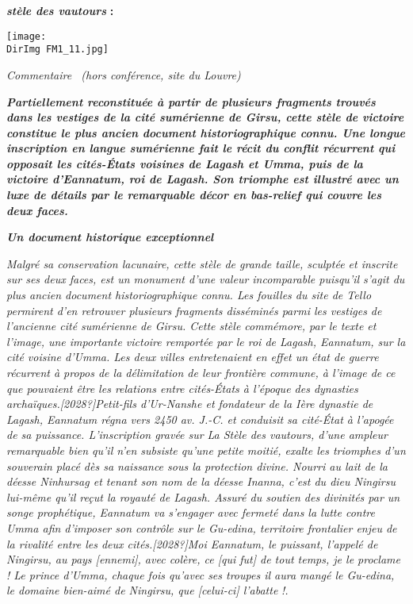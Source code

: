 \documentclass[a4paper]{article}
\newcommand{\DirImg}{../img/FaivreMartin/}
\begin{document}
\textbf{\textit{stèle des vautours}}\textbf{ : }


 \texttt{[image: \\DirImg FM1\_11.jpg]} 


\textit{Commentaire \ (hors conférence, site du Louvre)}


\textbf{\textit{\textcolor[rgb]{0.101960786,0.101960786,0.101960786}{Partiellement reconstituée à partir de plusieurs
fragments trouvés dans les vestiges de la cité sumérienne de Girsu, cette stèle de victoire constitue le plus ancien
document historiographique connu. Une longue inscription en langue sumérienne fait le récit du conflit récurrent qui
opposait les cités-États voisines de Lagash et Umma, puis de la victoire d'Eannatum, roi de Lagash. Son triomphe est
illustré avec un luxe de détails par le remarquable décor en bas-relief qui couvre les deux faces.}}}

\textbf{\textit{Un document historique exceptionnel}}

\textit{Malgré sa conservation lacunaire, cette stèle de grande taille, sculptée et inscrite sur ses deux faces, est un
monument d'une valeur incomparable puisqu'il s'agit du plus ancien document historiographique connu. Les fouilles du
site de Tello permirent d'en retrouver plusieurs fragments disséminés parmi les vestiges de l'ancienne cité sumérienne
de Girsu. Cette stèle commémore, par le texte et l'image, une importante victoire remportée par le roi de Lagash,
Eannatum, sur la cité voisine d'Umma. Les deux villes entretenaient en effet un état de guerre récurrent à propos de la
délimitation de leur frontière commune, à l'image de ce que pouvaient être les relations entre cités-États à l'époque
des dynasties archaïques.[2028?]Petit-fils d'Ur-Nanshe et fondateur de la Ière dynastie de Lagash, Eannatum régna vers
2450 av. J.-C. et conduisit sa cité-État à l'apogée de sa puissance. L'inscription gravée sur }\textit{La Stèle des
vautours}\textit{, d'une ampleur remarquable bien qu'il n'en subsiste qu'une petite moitié, exalte les triomphes d'un
souverain placé dès sa naissance sous la protection divine. Nourri au lait de la déesse Ninhursag et tenant son nom de
la déesse Inanna, c'est du dieu Ningirsu lui-même qu'il reçut la royauté de Lagash. Assuré du soutien des divinités par
un songe prophétique, Eannatum va s'engager avec fermeté dans la lutte contre Umma afin d'imposer son contrôle sur le
Gu-edina, territoire frontalier enjeu de la rivalité entre les deux cités.[2028?]{\textquotedbl}}\textit{Moi Eannatum,
le puissant, l'appelé de Ningirsu, au pays [ennemi], avec colère, ce [qui fut] de tout temps, je le proclame ! Le
prince d'Umma, chaque fois qu'avec ses troupes il aura mangé le Gu-edina, le domaine bien-aimé de Ningirsu, que
[celui-ci] l'abatte }\textit{!{\textquotedbl}.}
\end{document}
